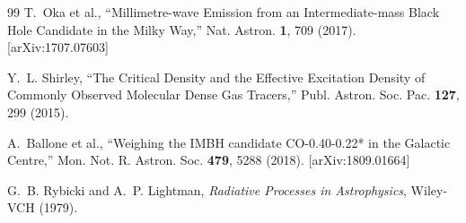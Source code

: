 \documentclass[twocolumn,amsmath,amssymb,prd,superscriptaddress,nofootinbib]{revtex4-2}
\begin{document}
\begin{thebibliography}{99}
T.~Oka et al.,
``Millimetre-wave Emission from an Intermediate-mass Black Hole Candidate in the Milky Way,''
Nat. Astron. \textbf{1}, 709 (2017).
[arXiv:1707.07603]

Y.~L. Shirley,
``The Critical Density and the Effective Excitation Density of Commonly Observed Molecular Dense Gas Tracers,''
Publ. Astron. Soc. Pac. \textbf{127}, 299 (2015).

A.~Ballone et al.,
``Weighing the IMBH candidate CO-0.40-0.22* in the Galactic Centre,''
Mon. Not. R. Astron. Soc. \textbf{479}, 5288 (2018).
[arXiv:1809.01664]

G.~B. Rybicki and A.~P. Lightman,
\textit{Radiative Processes in Astrophysics},
Wiley-VCH (1979).

\end{thebibliography}
\end{document}
